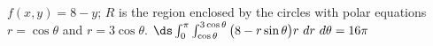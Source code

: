 {$f(x,y) = 8-y$; $R$ is the region enclosed by the circles with polar equations $r=\cos\theta$ and $r=3\cos\theta$.
}
{$\ds \int_0^{\pi}\int_{\cos\theta}^{3\cos\theta} \big(8-r\sin\theta\big)r\ dr\ d\theta = 16\pi$
}